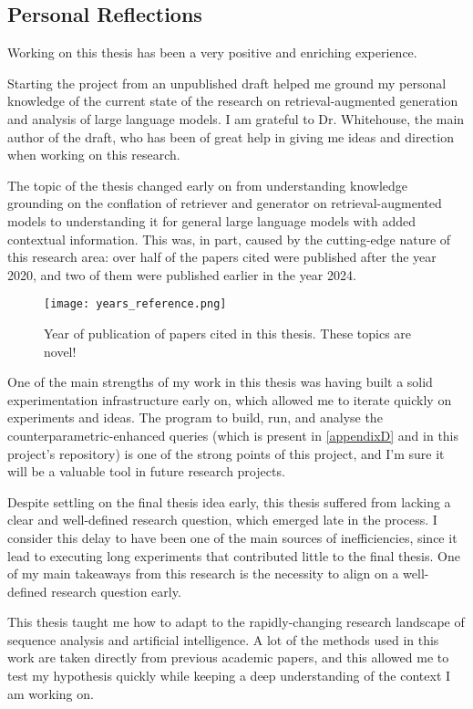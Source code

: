 \newpage{}
\subsection{Personal Reflections}

Working on this thesis has been a very positive and enriching experience.

Starting the project from an unpublished draft \citep{knowledge_grounding_retrieval_augmented} helped me ground my personal knowledge of the current state of the research on retrieval-augmented generation and analysis of large language models.
I am grateful to Dr. Whitehouse, the main author of the draft, who has been of great help in giving me ideas and direction when working on this research.

The topic of the thesis changed early on from understanding knowledge grounding on the conflation of retriever and generator on retrieval-augmented models to understanding it for general large language models with added contextual information.
This was, in part, caused by the cutting-edge nature of this research area: over half of the papers cited were published after the year 2020, and two of them were published earlier in the year 2024.

\begin{figure}[ht]
	\centering
	\texttt{[image: years\_reference.png]}
	\caption{Year of publication of papers cited in this thesis. These topics are novel!}
\end{figure}

One of the main strengths of my work in this thesis was having built a solid experimentation infrastructure early on, which allowed me to iterate quickly on experiments and ideas.
The program to build, run, and analyse the counterparametric-enhanced queries (which is present in \cref{appendixD} and in this project's repository) is one of the strong points of this project, and I'm sure it will be a valuable tool in future research projects.

Despite settling on the final thesis idea early, this thesis suffered from lacking a clear and well-defined research question, which emerged late in the process.
I consider this delay to have been one of the main sources of inefficiencies, since it lead to executing long experiments that contributed little to the final thesis.
One of my main takeaways from this research is the necessity to align on a well-defined research question early.

This thesis taught me how to adapt to the rapidly-changing research landscape of sequence analysis and artificial intelligence.
A lot of the methods used in this work are taken directly from previous academic papers, and this allowed me to test my hypothesis quickly while keeping a deep understanding of the context I am working on.

